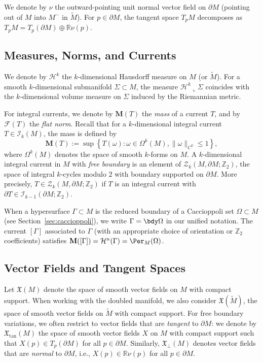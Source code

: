We denote by $\nu$ the outward-pointing unit normal vector field on $\partial M$ (pointing out of $M$
into $M^-$ in $\widetilde{M}$). For $p \in \partial M$, the tangent space $T_p M$ decomposes as
$T_p M = T_p(\partial M) \oplus \mathbb{R} \nu(p)$.

\subsection{Measures, Norms, and Currents}\label{subsec:measures-norms}
We denote by $\mathcal{H}^k$ the $k$-dimensional Hausdorff measure on $M$ (or $\widetilde{M}$). For a smooth $k$-dimensional submanifold $\Sigma \subset M$,
the measure $\mathcal{H}^k \llcorner \Sigma$ coincides with the $k$-dimensional volume measure on
$\Sigma$ induced by the Riemannian metric. 

For integral currents, we denote by $\mathbf{M}(T)$ the \emph{mass} of a current $T$, and by
$\mathcal{F}(T)$ the \emph{flat norm}. Recall that for a $k$-dimensional integral current
$T \in \mathcal{I}_k(M)$, the mass is defined by
\begin{equation*}
    \mathbf{M}(T) := \sup\left\{ T(\omega) : \omega \in \Omega^k(M), \|\omega\|_{C^0} \leq 1 \right\},
\end{equation*}
where $\Omega^k(M)$ denotes the space of smooth $k$-forms on $M$. A $k$-dimensional integral current in $M$ with \emph{free boundary} is an element of $\mathcal{Z}_k(M, \partial M; \mathbb{Z}_2)$, the space of integral $k$-cycles modulo $2$ with boundary supported on $\partial M$. More precisely, $T \in \mathcal{Z}_k(M, \partial M; \mathbb{Z}_2)$ if $T$ is an integral current with $\partial T \in \mathcal{I}_{k-1}(\partial M; \mathbb{Z}_2)$.

When a hypersurface $\Gamma \subset M$ is the reduced boundary of a Caccioppoli set $\Omega \subset M$ (see Section~\ref{sec:caccioppoli}), we write $\Gamma = \bdy \Omega$ in our unified notation. The current $[\Gamma]$ associated to $\Gamma$ (with an
appropriate choice of orientation or $\mathbb{Z}_2$ coefficients) satisfies
$\mathbf{M}([\Gamma]) = \mathcal{H}^n(\Gamma) = \Per_M(\Omega)$.

\subsection{Vector Fields and Tangent Spaces}\label{subsec:vector-fields}

Let $\mathfrak{X}(M)$ denote the space of smooth vector fields on $M$ with compact support. When
working with the doubled manifold, we also consider $\mathfrak{X}(\widetilde{M})$, the space of smooth
vector fields on $\widetilde{M}$ with compact support. For free boundary variations, we often restrict
to vector fields that are \emph{tangent} to $\partial M$: we denote by $\mathfrak{X}_{\tan}(M)$ the
space of smooth vector fields $X$ on $M$ with compact support such that $X(p) \in T_p(\partial M)$ for
all $p \in \partial M$. Similarly, $\mathfrak{X}_{\perp}(M)$ denotes vector fields that are
\emph{normal} to $\partial M$, i.e., $X(p) \in \mathbb{R} \nu(p)$ for all $p \in \partial M$.

